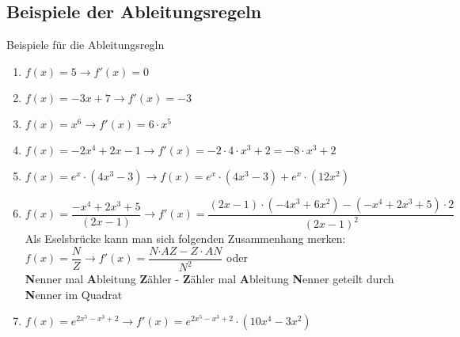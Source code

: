 \subsection{Beispiele der Ableitungsregeln}
\begin{bsp}{Beispiele für die Ableitungsregln}{}
\begin{enumerate}
    \item $f(x) = 5 \longrightarrow f'(x) = 0$
    \item $f(x) = -3x +7 \longrightarrow f'(x) = -3 $
    \item $f(x) = x^6 \longrightarrow f'(x) = 6\cdot x^5$
    \item $f(x) = -2x^4+2x-1 \longrightarrow f'(x) = -2\cdot 4\cdot x^3 + 2 = -8\cdot x^3 +2$
    \item $f(x) = e^x \cdot (4x^3 -3) \longrightarrow f(x) = e^x \cdot (4x^3-3) + e^x \cdot (12x^2)$
    \item $f(x) = \dfrac{-x^4+ 2x^3 + 5 }{(2x-1)} \longrightarrow f'(x) = \dfrac{(2x-1)\cdot (-4x^3+6x^2) - (-x^4 +2x^3 + 5)\cdot 2 }{(2x-1)^2}$ \\[0.2cm]
    Als Eselsbrücke kann man sich folgenden Zusammenhang merken: \\[0.2cm]
    $f(x) = \dfrac{N}{Z} \longrightarrow f'(x) = \dfrac{{N}{\cdot {AZ} -{}Z}\cdot {AN}}{{N}^2}$ oder\\[0.2cm]  {\bfseries\color{red}N}enner mal {\bfseries\color{red}A}bleitung {\bfseries\color{red}Z}ähler - {\bfseries\color{red}Z}ähler mal {\bfseries\color{red}A}bleitung {\bfseries\color{red}N}enner geteilt durch {\bfseries\color{red}N}enner im Quadrat
    \item $f(x)= e^{2x^5-x^3+2 }\longrightarrow f'(x) = e^{2x^5-x^3 + 2} \cdot (10x^4 -3x^2)$
\end{enumerate}
\end{bsp}
